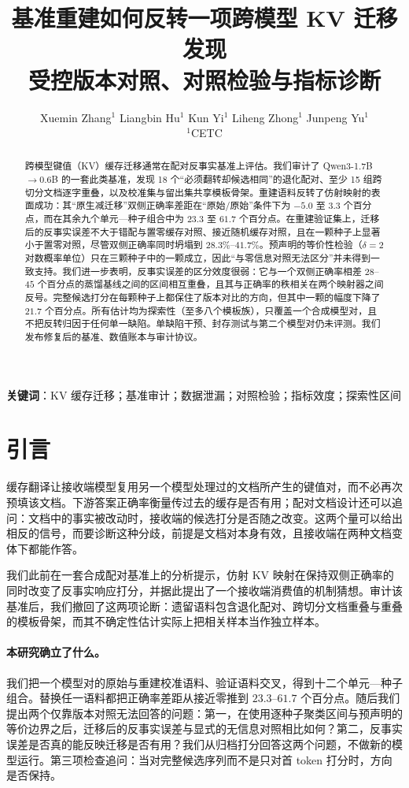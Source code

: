 \documentclass[11pt]{article}
\title{基准重建如何反转一项跨模型 KV 迁移发现\\[2pt]
\large 受控版本对照、对照检验与指标诊断}
\author{Xuemin Zhang$^{1}$ \quad Liangbin Hu$^{1}$ \quad Kun Yi$^{1}$ \quad Liheng Zhong$^{1}$ \quad Junpeng Yu$^{1}$\\[2pt]
\small $^{1}$CETC}
\date{}
\begin{document}
\maketitle

\begin{abstract}
\noindent
跨模型键值（KV）缓存迁移通常在配对反事实基准上评估。我们审计了 Qwen3-1.7B$\to$0.6B 的一套此类基准，发现 18 个“必须翻转却候选相同”的退化配对、至少 15 组跨切分文档逐字重叠，以及校准集与留出集共享模板骨架。重建语料反转了仿射映射的表面成功：其“原生减迁移”双侧正确率差距在“原始/原始”条件下为 $-5.0$ 至 $3.3$ 个百分点，而在其余九个单元—种子组合中为 $23.3$ 至 $61.7$ 个百分点。在重建验证集上，迁移后的反事实误差不大于错配与置零缓存对照、接近随机缓存对照，且在一颗种子上显著小于置零对照，尽管双侧正确率同时坍塌到 $28.3\%$--$41.7\%$。预声明的等价性检验（$\delta=2$ 对数概率单位）只在三颗种子中的一颗成立，因此“与零信息对照无法区分”并未得到一致支持。我们进一步表明，反事实误差的区分效度很弱：它与一个双侧正确率相差 $28$--$45$ 个百分点的蒸馏基线之间的区间相互重叠，且其与正确率的秩相关在两个映射器之间反号。完整候选打分在每颗种子上都保住了版本对比的方向，但其中一颗的幅度下降了 $21.7$ 个百分点。所有估计均为探索性（至多八个模板族），只覆盖一个合成模型对，且不把反转归因于任何单一缺陷。单缺陷干预、封存测试与第二个模型对仍未评测。我们发布修复后的基准、数值账本与审计协议。
\end{abstract}

\noindent\textbf{关键词}：KV 缓存迁移；基准审计；数据泄漏；对照检验；指标效度；探索性区间

\section{引言}

缓存翻译让接收端模型复用另一个模型处理过的文档所产生的键值对，而不必再次预填该文档。下游答案正确率衡量传过去的缓存是否有用；配对文档设计还可以追问：文档中的事实被改动时，接收端的候选打分是否随之改变。这两个量可以给出相反的信号，而要诊断这种分歧，前提是文档对本身有效，且接收端在两种文档变体下都能作答。

我们此前在一套合成配对基准上的分析提示，仿射 KV 映射在保持双侧正确率的同时改变了反事实响应打分，并据此提出了一个接收端消费值的机制猜想。审计该基准后，我们撤回了这两项论断：遗留语料包含退化配对、跨切分文档重叠与重叠的模板骨架，而其不确定性估计实际上把相关样本当作独立样本。

\paragraph{本研究确立了什么。}
我们把一个模型对的原始与重建校准语料、验证语料交叉，得到十二个单元—种子组合。替换任一语料都把正确率差距从接近零推到 $23.3$--$61.7$ 个百分点。随后我们提出两个仅靠版本对照无法回答的问题：第一，在使用逐种子聚类区间与预声明的等价边界之后，迁移后的反事实误差与显式的无信息对照相比如何？第二，反事实误差是否真的能反映迁移是否有用？我们从归档打分回答这两个问题，不做新的模型运行。第三项检查追问：当对完整候选序列而不是只对首 token 打分时，方向是否保持。
\end{document}
